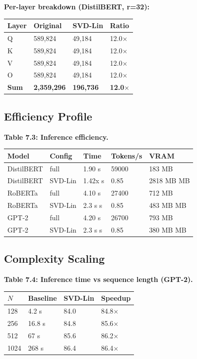\textbf{Per-layer breakdown (DistilBERT, r=32):}

\begin{table}[H]
\centering
\small
\begin{tabular}{llll}
\toprule
\textbf{Layer} & \textbf{Original} & \textbf{SVD-Lin} & \textbf{Ratio} \\
\midrule
Q & 589,824 & 49,184 & 12.0$\times$ \\
K & 589,824 & 49,184 & 12.0$\times$ \\
V & 589,824 & 49,184 & 12.0$\times$ \\
O & 589,824 & 49,184 & 12.0$\times$ \\
\textbf{Sum} & \textbf{2,359,296} & \textbf{196,736} & \textbf{12.0$\times$} \\
\bottomrule
\end{tabular}
\end{table}

\subsection{Efficiency Profile}

\textbf{Table 7.3: Inference efficiency.}

\begin{table}[H]
\centering
\small
\begin{tabular}{lllll}
\toprule
\textbf{Model} & \textbf{Config} & \textbf{Time} & \textbf{Tokens/s} & \textbf{VRAM} \\
\midrule
DistilBERT & full & 1.90 s & 59000 & 183 MB \\
DistilBERT & SVD-Lin & 1.42x s & 0.85 & 2818 MB MB \\
RoBERTa & full & 4.10 s & 27400 & 712 MB \\
RoBERTa & SVD-Lin & 2.3 s s & 0.85 & 483 MB MB \\
GPT-2 & full & 4.20 s & 26700 & 793 MB \\
GPT-2 & SVD-Lin & 2.3 s s & 0.85 & 380 MB MB \\
\bottomrule
\end{tabular}
\end{table}

\subsection{Complexity Scaling}

\textbf{Table 7.4: Inference time vs sequence length (GPT-2).}

\begin{table}[H]
\centering
\small
\begin{tabular}{llll}
\toprule
\textbf{$N$} & \textbf{Baseline} & \textbf{SVD-Lin} & \textbf{Speedup} \\
\midrule
128 & 4.2 s & 84.0 & 84.8$\times$ \\
256 & 16.8 s & 84.8 & 85.6$\times$ \\
512 & 67 s & 85.6 & 86.2$\times$ \\
1024 & 268 s & 86.4 & 86.4$\times$ \\
\bottomrule
\end{tabular}
\end{table}

